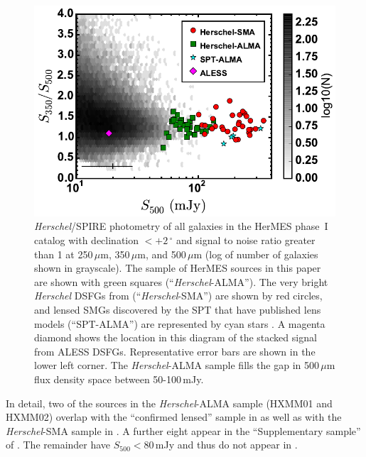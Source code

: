 \documentclass[iop]{emulateapj}
\begin{document}
\begin{figure}[!tbp] 
\includegraphics[width=\linewidth]{../Figures/spirecolflux.pdf}

\caption{ {\it Herschel}/SPIRE photometry of all galaxies in the HerMES phase~I
catalog with declination $< +2\,^\circ$ and signal to noise ratio greater than
1 at 250$\,\mu$m, 350$\,\mu$m, and 500$\,\mu$m (log of number of galaxies shown
in grayscale).  The sample of HerMES sources in this paper are shown with green
squares (``{\it Herschel}-ALMA'').  The very bright {\it Herschel} DSFGs from
\citet{Bussmann:2013lr} (``{\it Herschel}-SMA'') are shown by red circles, and
lensed SMGs discovered by the SPT that have published lens models
(``SPT-ALMA'') are represented by cyan stars \citep{Hezaveh:2013fk}.  A magenta
diamond shows the location in this diagram of the stacked signal from ALESS
DSFGs.  Representative error bars are shown in the lower left corner.  The {\it
Herschel}-ALMA sample fills the gap in 500$\,\mu$m flux density space between
50-100$\,$mJy.} \label{fig:sample}

\end{figure}

In detail, two of the sources in the {\it Herschel}-ALMA sample (HXMM01 and
HXMM02) overlap with the ``confirmed lensed'' sample in \citet{Wardlow:2013lr}
as well as with the {\it Herschel}-SMA sample in \citet{Bussmann:2013lr}.  A
further eight appear in the ``Supplementary sample'' of \citet{Wardlow:2013lr}.
The remainder have $S_{500} < 80\,$mJy and thus do not appear in
\citet{Wardlow:2013lr}.
\end{document}
